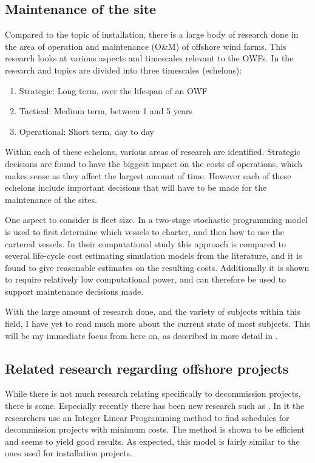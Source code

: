 \documentclass[a4paper,12pt]{article}
\begin{document}
\subsection{Maintenance of the site} \label{ss:maint}

Compared to the topic of installation, there is a large body of research done in the area of operation and maintenance (O\&M) of offshore wind farms. This research looks at various aspects and timescales relevant to the OWFs. In \cite{shafiee2015maintenance} the research and topics are divided into three timescales (echelons):

\begin{enumerate}
\item Strategic: Long term, over the lifespan of an OWF
\item Tactical: Medium term, between 1 and 5 years
\item Operational: Short term, day to day
\end{enumerate}

Within each of these echelons, various areas of research are identified. Strategic decisions are found to have the biggest impact on the costs of operations, which makes sense as they affect the largest amount of time. However each of these echelons include important decisions that will have to be made for the maintenance of the sites. 

One aspect to consider is fleet size. In \cite{staalhane2019optimizing} a two-stage stochastic programming model is used to first determine which vessels to charter, and then how to use the cartered vessels. In their computational study this approach is compared to several life-cycle cost estimating simulation models from the literature, and it is found to give reasonable estimates on the resulting costs. Additionally it is shown to require relatively low computational power, and can therefore be used to support maintenance decisions made. 

With the large amount of research done, and the variety of subjects within this field, I have yet to read much more about the current state of most subjects. This will be my immediate focus from here on, as described in more detail in .



\subsection{Related research regarding offshore projects} \label{ss:offsh}
While there is not much research relating specifically to decommission projects, there is some. Especially recently there has been new research such as \cite{irawan2019optimisation}. In it the researchers use an Integer Linear Programming method to find schedules for decommission projects with minimum costs. The method is shown to be efficient and seems to yield good results. As expected, this model is fairly similar to the ones used for installation projects. 
\end{document}
